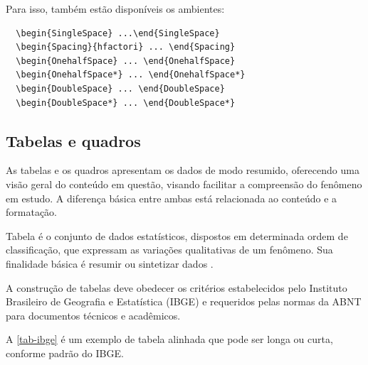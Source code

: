 Para isso, também estão disponíveis os ambientes:
\begin{verbatim}
  \begin{SingleSpace} ...\end{SingleSpace}
  \begin{Spacing}{hfactori} ... \end{Spacing}
  \begin{OnehalfSpace} ... \end{OnehalfSpace}
  \begin{OnehalfSpace*} ... \end{OnehalfSpace*}
  \begin{DoubleSpace} ... \end{DoubleSpace}
  \begin{DoubleSpace*} ... \end{DoubleSpace*} 
\end{verbatim}

\subsection{Tabelas e quadros}

As tabelas e os quadros apresentam os dados de modo resumido, oferecendo uma visão geral do conteúdo em questão, visando facilitar a compreensão do fenômeno em estudo. A diferença básica entre ambas está relacionada ao conteúdo e a formatação. 

Tabela é o conjunto de dados estatísticos, dispostos em determinada ordem de classificação, que expressam as variações qualitativas de um fenômeno. Sua finalidade básica é resumir ou sintetizar dados \cite{sibi2016}.

A construção de tabelas deve obedecer os critérios estabelecidos pelo Instituto Brasileiro de Geografia e Estatística (IBGE) e requeridos pelas normas da ABNT para documentos técnicos e acadêmicos.

A \autoref{tab-ibge} é um exemplo de tabela alinhada que pode ser longa ou curta, conforme padrão do IBGE.

\begin{table}[htb]
\end{table}


